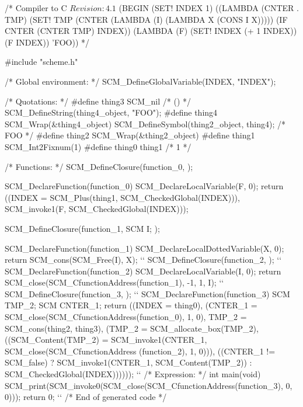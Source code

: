 \begin{code:c-frame}[numbers=left, title={\snippet{o/chap10ex.c}},
    label=cc/gen/init/src:result]
/* Compiler to C $Revision: 4.1$
(BEGIN
  (SET! INDEX 1)
  ((LAMBDA
     (CNTER . TMP)
     (SET! TMP (CNTER (LAMBDA (I) (LAMBDA X (CONS I X)))))
     (IF CNTER (CNTER TMP) INDEX))
    (LAMBDA (F) (SET! INDEX (+ 1 INDEX)) (F INDEX))
    'FOO))
*/

#include "scheme.h"

/* Global environment: */
SCM_DefineGlobalVariable(INDEX, "INDEX");

/* Quotations: */
#define thing3 SCM_nil                      /* () */
SCM_DefineString(thing4_object, "FOO");
#define thing4 SCM_Wrap(&thing4_object)
SCM_DefineSymbol(thing2_object, thing4);    /* FOO */
#define thing2 SCM_Wrap(&thing2_object)
#define thing1 SCM_Int2Fixnum(1)
#define thing0 thing1                       /* 1 */

/* Functions: */
SCM_DefineClosure(function_0, );

SCM_DeclareFunction(function_0)
{
    SCM_DeclareLocalVariable(F, 0);
    return ((INDEX = SCM_Plus(thing1,
                              SCM_CheckedGlobal(INDEX))),
            SCM_invoke1(F,
                        SCM_CheckedGlobal(INDEX)));
}

SCM_DefineClosure(function_1, SCM I; );

SCM_DeclareFunction(function_1)
{
    SCM_DeclareLocalDottedVariable(X, 0);
    return SCM_cons(SCM_Free(I),
                    X);
}
``
SCM_DefineClosure(function_2, );
``
SCM_DeclareFunction(function_2)
{
    SCM_DeclareLocalVariable(I, 0);
    return SCM_close(SCM_CfunctionAddress(function_1), -1, 1, I);
}
``
SCM_DefineClosure(function_3, );
``
SCM_DeclareFunction(function_3)
{
    SCM TMP_2; SCM CNTER_1;
    return ((INDEX = thing0),
            (CNTER_1 = SCM_close(SCM_CfunctionAddress(function_0), 1, 0),
             TMP_2 = SCM_cons(thing2,
                              thing3),
             (TMP_2 = SCM_allocate_box(TMP_2),
              ((SCM_Content(TMP_2) =
               SCM_invoke1(CNTER_1, SCM_close(SCM_CfunctionAddress
                                              (function_2), 1, 0))),
               ((CNTER_1 != SCM_false)
                ? SCM_invoke1(CNTER_1,
                              SCM_Content(TMP_2))
                : SCM_CheckedGlobal(INDEX))))));
}
``
/* Expression: */
int main(void)
{
    SCM_print(SCM_invoke0(SCM_close(SCM_CfunctionAddress(function_3),
                                    0, 0)));
    return 0;
}
``
/* End of generated code */
\end{code:c-frame}


